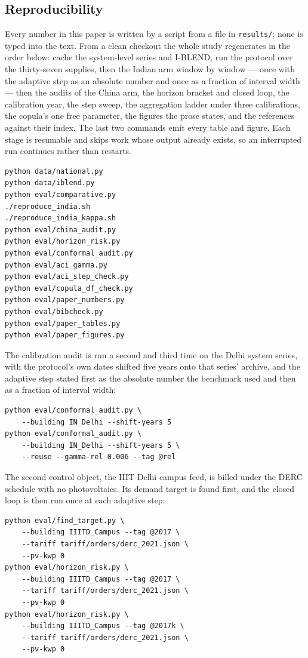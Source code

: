\subsection*{Reproducibility}

Every number in this paper is written by a script from a file in
\texttt{results/}; none is typed into the text. From a clean checkout the whole
study regenerates in the order below: cache the system-level series and
I-BLEND, run the protocol over the thirty-seven supplies, then the Indian arm
window by window --- once with the adaptive step as an absolute number and once
as a fraction of interval width --- then the audits of the China arm, the
horizon bracket and closed loop, the calibration year, the step sweep, the
aggregation ladder under three calibrations, the copula's one free parameter,
the figures the prose states, and the references against their index. The last two commands emit every table
and figure. Each stage is resumable and skips work whose output already exists,
so an interrupted run continues rather than restarts.

{\footnotesize
\begin{verbatim}
python data/national.py
python data/iblend.py
python eval/comparative.py
./reproduce_india.sh
./reproduce_india_kappa.sh
python eval/china_audit.py
python eval/horizon_risk.py
python eval/conformal_audit.py
python eval/aci_gamma.py
python eval/aci_step_check.py
python eval/copula_df_check.py
python eval/paper_numbers.py
python eval/bibcheck.py
python eval/paper_tables.py
python eval/paper_figures.py
\end{verbatim}}

\noindent The calibration audit is run a second and third time on the Delhi
system series, with the protocol's own dates shifted five years onto that
series' archive, and the adaptive step stated first as the absolute number the
benchmark used and then as a fraction of interval width:

{\footnotesize
\begin{verbatim}
python eval/conformal_audit.py \
    --building IN_Delhi --shift-years 5
python eval/conformal_audit.py \
    --building IN_Delhi --shift-years 5 \
    --reuse --gamma-rel 0.006 --tag @rel
\end{verbatim}}

\noindent The second control object, the IIIT-Delhi campus feed, is billed
under the DERC schedule with no photovoltaics. Its demand target is found
first, and the closed loop is then run once at each adaptive step:

{\footnotesize
\begin{verbatim}
python eval/find_target.py \
    --building IIITD_Campus --tag @2017 \
    --tariff tariff/orders/derc_2021.json \
    --pv-kwp 0
python eval/horizon_risk.py \
    --building IIITD_Campus --tag @2017 \
    --tariff tariff/orders/derc_2021.json \
    --pv-kwp 0
python eval/horizon_risk.py \
    --building IIITD_Campus --tag @2017k \
    --tariff tariff/orders/derc_2021.json \
    --pv-kwp 0
\end{verbatim}}
